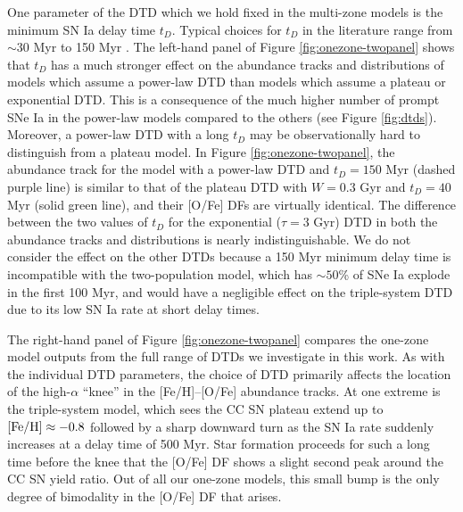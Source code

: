 \documentclass[twocolumn,twocolappendix,linenumbers,trackchanges]{aastex631}
\begin{document}
One parameter of the DTD which we hold fixed in the multi-zone models is the minimum SN Ia delay time $t_D$. Typical choices for $t_D$ in the literature range from $\sim 30$ Myr \citep[e.g.,][]{Poulhazan2018-PrecisionPollution} to 150 Myr . The left-hand panel of Figure \ref{fig:onezone-twopanel} shows that $t_D$ has a much stronger effect on the abundance tracks and distributions of models which assume a power-law DTD than models which assume a plateau or exponential DTD. This is a consequence of the much higher number of prompt SNe Ia in the power-law models compared to the others (see Figure \ref{fig:dtds}). Moreover, a power-law DTD with a long $t_D$ may be observationally hard to distinguish from a plateau model. In Figure \ref{fig:onezone-twopanel}, the abundance track for the model with a power-law DTD and $t_D=150$ Myr (dashed purple line) is similar to that of the plateau DTD with $W=0.3$ Gyr and $t_D=40$ Myr (solid green line), and their [O/Fe] DFs are virtually identical. The difference between the two values of $t_D$ for the exponential ($\tau=3$ Gyr) DTD in both the abundance tracks and distributions is nearly indistinguishable. We do not consider the effect on the other DTDs because a 150 Myr minimum delay time is incompatible with the two-population model, which has $\sim 50$\% of SNe Ia explode in the first 100 Myr, and would have a negligible effect on the triple-system DTD due to its low SN Ia rate at short delay times.

The right-hand panel of Figure \ref{fig:onezone-twopanel} compares the one-zone model outputs from the full range of DTDs we investigate in this work. As with the individual DTD parameters, the choice of DTD primarily affects the location of the high-$\alpha$ ``knee'' in the [Fe/H]--[O/Fe] abundance tracks. At one extreme is the triple-system model, which sees the CC SN plateau extend up to ${\rm [Fe/H]}\approx-0.8$ followed by a sharp downward turn as the SN Ia rate suddenly increases at a delay time of 500 Myr. Star formation proceeds for such a long time before the knee that the [O/Fe] DF shows a slight second peak around the CC SN yield ratio. Out of all our one-zone models, this small bump is the only degree of bimodality in the [O/Fe] DF that arises. 
\end{document}
